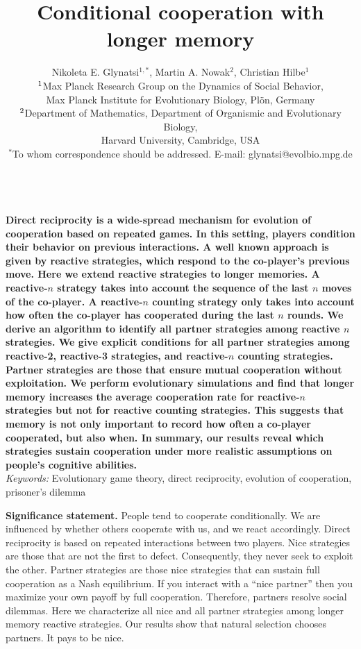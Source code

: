 \documentclass[11pt]{article}
\title{\bfseries \sffamily \Large Conditional cooperation with longer memory}
\author{Nikoleta E. Glynatsi$^{1,*}$, Martin A. Nowak$^2$, Christian Hilbe$^1$\\[0.3cm]
$^{\rm 1}$Max Planck Research Group on the Dynamics of Social Behavior,\\ Max Planck Institute for Evolutionary Biology, Pl\"{o}n, Germany \\
$^{\rm 2}$Department of Mathematics,
Department of Organismic and Evolutionary Biology,\\ Harvard University, Cambridge, USA\\
$^*$To whom correspondence should be addressed. E-mail: glynatsi@evolbio.mpg.de
}
\date{}
\begin{document}
\maketitle

~\\[0.5cm]
\noindent
{\bf 
Direct reciprocity is a wide-spread mechanism for evolution of cooperation based
on repeated games. In this setting, players condition their behavior on previous
interactions. A well known approach is given by reactive strategies, which
respond to the co-player's previous move. Here we extend reactive strategies to
longer memories. A reactive-$n$ strategy takes into account the sequence of the
last $n$ moves of the co-player. A reactive-$n$ counting strategy only takes
into account how often the co-player has cooperated during the last $n$ rounds.
We derive an algorithm to identify all partner strategies among reactive $n$
strategies. We give explicit conditions for all partner strategies among
reactive-2, reactive-3 strategies, and reactive-$n$ counting strategies. Partner
strategies are those that ensure mutual cooperation without exploitation. We
perform evolutionary simulations and find that longer memory increases the
average cooperation rate for reactive-$n$ strategies but not for reactive
counting strategies. This suggests that memory is not only important to record
how often a co-player cooperated, but also when. In summary, our results reveal
which strategies sustain cooperation under more realistic assumptions on
people's cognitive abilities.
}\\[1cm]


\noindent
{\it Keywords:} Evolutionary game theory, direct reciprocity, evolution of cooperation, prisoner's dilemma

\clearpage
\newpage



\noindent
{\bf Significance statement.}
People tend to cooperate conditionally. We are influenced by whether others
cooperate with us, and we react accordingly. Direct reciprocity is based on
repeated interactions between two players. Nice strategies are those that are
not the first to defect. Consequently, they never seek to exploit the other.
Partner strategies are those nice strategies that can sustain full cooperation
as a Nash equilibrium. If you interact with a ``nice partner'' then you maximize
your own payoff by full cooperation. Therefore, partners resolve social
dilemmas. Here we characterize all nice and all partner strategies among longer
memory reactive strategies. Our results show that natural selection chooses
partners. It pays to be nice.
\end{document}
